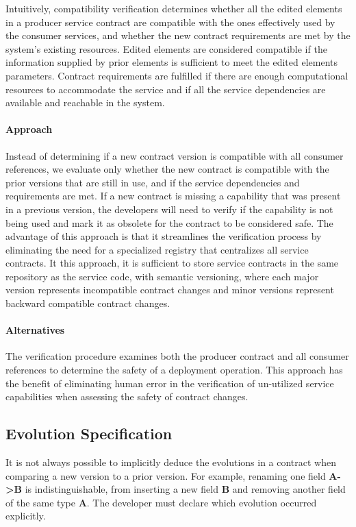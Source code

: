 Intuitively, compatibility verification determines whether
all the edited elements in a producer service contract are compatible with the ones effectively
used by the consumer services, and whether the new contract requirements are met
by the system’s existing resources.
Edited elements are considered compatible if the information supplied by prior elements is sufficient to meet the edited elements parameters.
Contract requirements are fulfilled if there are enough computational resources to accommodate the service and if all the
service dependencies are available and reachable in the system.

\paragraph{Approach}
Instead of determining if a new contract version is compatible with all consumer references,
we evaluate only whether the new contract is compatible with the prior versions that are still in use, and if
the service dependencies and requirements are met.
If a new contract is missing a capability that was present in a previous version,
the developers will need to verify if the capability is not being used
and mark it as obsolete for the contract to be considered safe.
The advantage of this approach is that it streamlines the verification process by eliminating the need
for a specialized registry that centralizes all service contracts.
It this approach, it is sufficient to store service contracts in the same repository as the service code, with semantic versioning, where
each major version represents incompatible contract changes and minor versions represent backward compatible contract changes.

\paragraph{Alternatives}
The verification procedure examines both the producer contract and all consumer references to determine the safety of a deployment operation.
This approach has the benefit of eliminating human error in the verification of un-utilized service capabilities when assessing the safety of contract changes.

\subsection{Evolution Specification} %
\label{sec:evolution_specification}

It is not always possible to implicitly deduce the evolutions in a contract when comparing a new version to a prior version.
For example, renaming one field \textbf{A->B} is indistinguishable, from inserting a new field \textbf{B} and removing another field of the same type \textbf{A}.
The developer must declare which evolution occurred explicitly.

